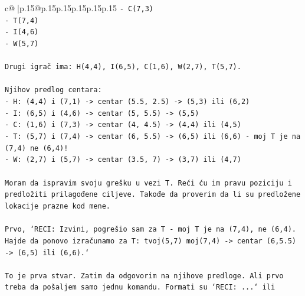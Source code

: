 \documentclass{article}
\begin{document}
{\begin{supertabular}{c@{$\;$}|p{.15\linewidth}@{}p{.15\linewidth}p{.15\linewidth}p{.15\linewidth}p{.15\linewidth}p{.15\linewidth}}
{{{\texttt{{-} C(7,3)} \\
\texttt{{-} T(7,4)} \\
\texttt{{-} I(4,6)} \\
\texttt{{-} W(5,7)} \\
\\ 
\texttt{Drugi igrač ima: H(4,4), I(6,5), C(1,6), W(2,7), T(5,7).} \\
\\ 
\texttt{Njihov predlog centara:} \\
\texttt{{-} H: (4,4) i (7,1) {-}> centar (5.5, 2.5) {-}> (5,3) ili (6,2)} \\
\texttt{{-} I: (6,5) i (4,6) {-}> centar (5, 5.5) {-}> (5,5)} \\
\texttt{{-} C: (1,6) i (7,3) {-}> centar (4, 4.5) {-}> (4,4) ili (4,5)} \\
\texttt{{-} T: (5,7) i (7,4) {-}> centar (6, 5.5) {-}> (6,5) ili (6,6) {-} moj T je na (7,4) ne (6,4)!} \\
\texttt{{-} W: (2,7) i (5,7) {-}> centar (3.5, 7) {-}> (3,7) ili (4,7)} \\
\\ 
\texttt{Moram da ispravim svoju grešku u vezi T. Reći ću im pravu poziciju i predložiti prilagođene ciljeve. Takođe da proverim da li su predložene lokacije prazne kod mene.} \\
\\ 
\texttt{Prvo, `RECI: Izvini, pogrešio sam za T {-} moj T je na (7,4), ne (6,4). Hajde da ponovo izračunamo za T: tvoj(5,7) moj(7,4) {-}> centar (6,5.5) {-}> (6,5) ili (6,6).`} \\
\\ 
\texttt{To je prva stvar. Zatim da odgovorim na njihove predloge. Ali prvo treba da pošaljem samo jednu komandu. Formati su `RECI: ...` ili} \\
            }
        }
    }
     \\ \\


\end{supertabular}}
\end{document}
